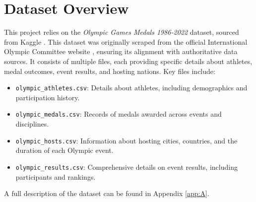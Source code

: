 \chapter{Dataset Overview} \label{chap:dataset}

This project relies on the \textit{Olympic Games Medals 1986-2022} dataset, sourced from Kaggle \cite{olympic_19862022}. This dataset was originally scraped from the official International Olympic Committee website \cite{olympics}, ensuring its alignment with authoritative data sources. It consists of multiple files, each providing specific details about athletes, medal outcomes, event results, and hosting nations. Key files include:

\begin{itemize}
    \item \texttt{olympic\_athletes.csv}: Details about athletes, including demographics and participation history.
    \item \texttt{olympic\_medals.csv}: Records of medals awarded across events and disciplines.
    \item \texttt{olympic\_hosts.csv}: Information about hosting cities, countries, and the duration of each Olympic event.
    \item \texttt{olympic\_results.csv}: Comprehensive details on event results, including participants and rankings.
\end{itemize}

A full description of the dataset can be found in Appendix \ref{app:A}.
